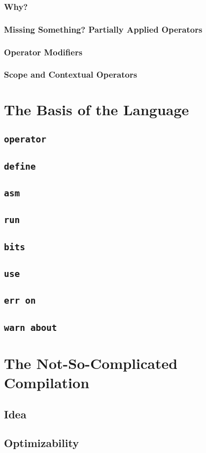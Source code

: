 \documentclass{article}
\newcommand{\secl}[1]{\section{#1}\label{sec:#1}}
\newcommand{\ssecl}[1]{\subsection{#1}\label{ssec:#1}}
\newcommand{\sssecl}[1]{\subsubsection{#1}\label{sssec:#1}}
\begin{document}
\sssecl{Why?}

\sssecl{Missing Something? Partially Applied Operators}

\sssecl{Operator Modifiers}

\sssecl{Scope and Contextual Operators}

\secl{The Basis of the Language}
\ssecl{\texttt{\textbf{operator}}}

\ssecl{\texttt{\textbf{define}}}

\ssecl{\texttt{\textbf{asm}}}

\ssecl{\texttt{\textbf{run}}}

\ssecl{\texttt{\textbf{bits}}}

\ssecl{\texttt{\textbf{use}}}

\ssecl{\texttt{\textbf{err on}}}
\ssecl{\texttt{\textbf{warn about}}}
\secl{The Not-So-Complicated Compilation}
\ssecl{Idea}

\ssecl{Optimizability}
\end{document}

